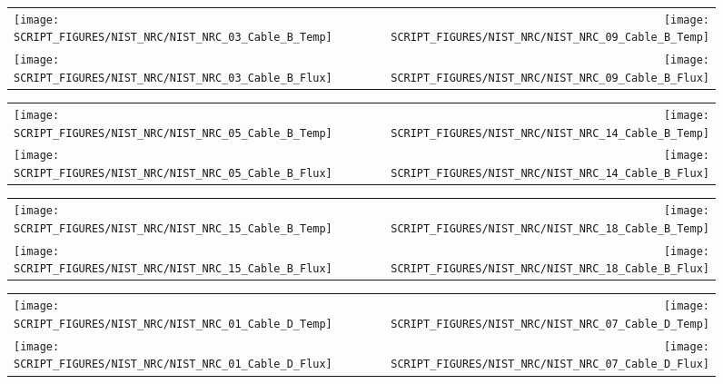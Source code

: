 \clearpage

\begin{figure}[!ht]
\begin{tabular*}{\textwidth}{l@{\extracolsep{\fill}}r}
\texttt{[image: SCRIPT\_FIGURES/NIST\_NRC/NIST\_NRC\_03\_Cable\_B\_Temp]} &
\texttt{[image: SCRIPT\_FIGURES/NIST\_NRC/NIST\_NRC\_09\_Cable\_B\_Temp]} \\
\texttt{[image: SCRIPT\_FIGURES/NIST\_NRC/NIST\_NRC\_03\_Cable\_B\_Flux]} &
\texttt{[image: SCRIPT\_FIGURES/NIST\_NRC/NIST\_NRC\_09\_Cable\_B\_Flux]}
\end{tabular*}
\label{NIST_NRC_B_3_and_9}
\end{figure}

\begin{figure}[!ht]
\begin{tabular*}{\textwidth}{l@{\extracolsep{\fill}}r}
\texttt{[image: SCRIPT\_FIGURES/NIST\_NRC/NIST\_NRC\_05\_Cable\_B\_Temp]} &
\texttt{[image: SCRIPT\_FIGURES/NIST\_NRC/NIST\_NRC\_14\_Cable\_B\_Temp]} \\
\texttt{[image: SCRIPT\_FIGURES/NIST\_NRC/NIST\_NRC\_05\_Cable\_B\_Flux]} &
\texttt{[image: SCRIPT\_FIGURES/NIST\_NRC/NIST\_NRC\_14\_Cable\_B\_Flux]}
\end{tabular*}
\label{NIST_NRC_B_5_and_14}
\end{figure}

\clearpage

\begin{figure}[!ht]
\begin{tabular*}{\textwidth}{l@{\extracolsep{\fill}}r}
\texttt{[image: SCRIPT\_FIGURES/NIST\_NRC/NIST\_NRC\_15\_Cable\_B\_Temp]} &
\texttt{[image: SCRIPT\_FIGURES/NIST\_NRC/NIST\_NRC\_18\_Cable\_B\_Temp]} \\
\texttt{[image: SCRIPT\_FIGURES/NIST\_NRC/NIST\_NRC\_15\_Cable\_B\_Flux]} &
\texttt{[image: SCRIPT\_FIGURES/NIST\_NRC/NIST\_NRC\_18\_Cable\_B\_Flux]}
\end{tabular*}
\label{NIST_NRC_B_15_and_18}
\end{figure}

\clearpage

\begin{figure}[!ht]
\begin{tabular*}{\textwidth}{l@{\extracolsep{\fill}}r}
\texttt{[image: SCRIPT\_FIGURES/NIST\_NRC/NIST\_NRC\_01\_Cable\_D\_Temp]} &
\texttt{[image: SCRIPT\_FIGURES/NIST\_NRC/NIST\_NRC\_07\_Cable\_D\_Temp]} \\
\texttt{[image: SCRIPT\_FIGURES/NIST\_NRC/NIST\_NRC\_01\_Cable\_D\_Flux]} &
\texttt{[image: SCRIPT\_FIGURES/NIST\_NRC/NIST\_NRC\_07\_Cable\_D\_Flux]}
\end{tabular*}
\label{NIST_NRC_D_1_and_7}
\end{figure}

